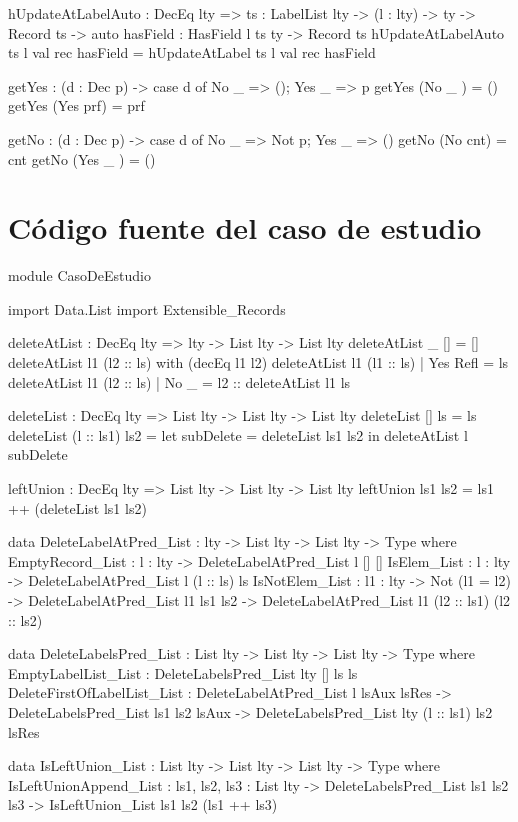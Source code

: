 \begin{code}
hUpdateAtLabelAuto : DecEq lty => {ts : LabelList lty} -> 
  (l : lty) -> ty -> Record ts -> 
  {auto hasField : HasField l ts ty} -> Record ts
hUpdateAtLabelAuto {ts} l val rec {hasField} = 
  hUpdateAtLabel {ts} l val rec hasField

getYes : (d : Dec p) -> case d of { No _ => (); Yes _ => p}
getYes (No _ ) = ()
getYes (Yes prf) = prf

getNo : (d : Dec p) -> case d of { No _ => Not p; Yes _ => ()}
getNo (No cnt) = cnt
getNo (Yes _ ) = ()
\end{code}

\section{Código fuente del caso de estudio}

\begin{code}
module CasoDeEstudio

import Data.List
import Extensible_Records



deleteAtList : DecEq lty => lty -> List lty -> List lty
deleteAtList _ [] = []
deleteAtList l1 (l2 :: ls) with (decEq l1 l2)
  deleteAtList l1 (l1 :: ls) | Yes Refl = ls
  deleteAtList l1 (l2 :: ls) | No _ = l2 :: deleteAtList l1 ls

deleteList : DecEq lty => List lty -> List lty -> List lty
deleteList [] ls = ls
deleteList (l :: ls1) ls2 =
  let subDelete = deleteList ls1 ls2
  in deleteAtList l subDelete

leftUnion : DecEq lty => List lty -> List lty -> List lty
leftUnion ls1 ls2 = ls1 ++ (deleteList ls1 ls2)

data DeleteLabelAtPred_List : lty -> List lty -> List lty -> 
  Type where
  EmptyRecord_List : {l : lty} -> DeleteLabelAtPred_List l [] []
  IsElem_List : {l : lty} -> DeleteLabelAtPred_List l (l :: ls) ls
  IsNotElem_List : {l1 : lty} -> Not (l1 = l2) -> 
    DeleteLabelAtPred_List l1 ls1 ls2 -> 
    DeleteLabelAtPred_List l1 (l2 :: ls1) (l2 :: ls2)

data DeleteLabelsPred_List : List lty -> List lty -> List lty -> 
  Type where
  EmptyLabelList_List : DeleteLabelsPred_List {lty} [] ls ls
  DeleteFirstOfLabelList_List : 
    DeleteLabelAtPred_List l lsAux lsRes -> 
    DeleteLabelsPred_List ls1 ls2 lsAux ->
    DeleteLabelsPred_List {lty} (l :: ls1) ls2 lsRes

data IsLeftUnion_List : List lty -> List lty -> List lty -> 
  Type where
  IsLeftUnionAppend_List : {ls1, ls2, ls3 : List lty} -> 
    DeleteLabelsPred_List ls1 ls2 ls3 -> 
    IsLeftUnion_List ls1 ls2 (ls1 ++ ls3)


\end{code}
